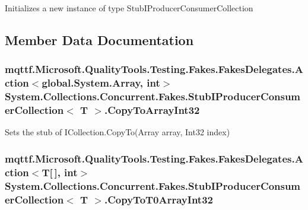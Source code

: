 Initializes a new instance of type Stub\-I\-Producer\-Consumer\-Collection



\subsection{Member Data Documentation}
\hypertarget{class_system_1_1_collections_1_1_concurrent_1_1_fakes_1_1_stub_i_producer_consumer_collection_3_01_t_01_4_a38428d6a597c23254642e1002f603867}{
\subsubsection[{Copy\-To\-Array\-Int32}]{\setlength{\rightskip}{0pt plus 5cm}mqttf.\-Microsoft.\-Quality\-Tools.\-Testing.\-Fakes.\-Fakes\-Delegates.\-Action$<$global.\-System.\-Array, int$>$ System.\-Collections.\-Concurrent.\-Fakes.\-Stub\-I\-Producer\-Consumer\-Collection$<$ T $>$.Copy\-To\-Array\-Int32}}\label{class_system_1_1_collections_1_1_concurrent_1_1_fakes_1_1_stub_i_producer_consumer_collection_3_01_t_01_4_a38428d6a597c23254642e1002f603867}


Sets the stub of I\-Collection.\-Copy\-To(\-Array array, Int32 index)

\hypertarget{class_system_1_1_collections_1_1_concurrent_1_1_fakes_1_1_stub_i_producer_consumer_collection_3_01_t_01_4_a74ee71ca818e3a9667b19fdeba6380bf}{
\subsubsection[{Copy\-To\-T0\-Array\-Int32}]{\setlength{\rightskip}{0pt plus 5cm}mqttf.\-Microsoft.\-Quality\-Tools.\-Testing.\-Fakes.\-Fakes\-Delegates.\-Action$<$T\mbox{[}$\,$\mbox{]}, int$>$ System.\-Collections.\-Concurrent.\-Fakes.\-Stub\-I\-Producer\-Consumer\-Collection$<$ T $>$.Copy\-To\-T0\-Array\-Int32}}\label{class_system_1_1_collections_1_1_concurrent_1_1_fakes_1_1_stub_i_producer_consumer_collection_3_01_t_01_4_a74ee71ca818e3a9667b19fdeba6380bf}


